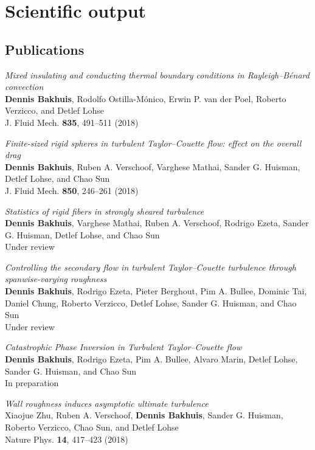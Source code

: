 \chapter{Scientific output}
\section*{Publications}
\begin{packeditemize}
\item \textit{Mixed insulating and conducting thermal boundary conditions in Rayleigh–Bénard convection} \\
\textbf{Dennis Bakhuis}, Rodolfo Ostilla-M\'onico, Erwin P. van der Poel,
Roberto Verzicco, and Detlef Lohse \\
J. Fluid Mech. \textbf{835}, 491--511 (2018)

\item \textit{Finite-sized rigid spheres in turbulent Taylor–Couette flow: effect on the overall drag} \\ 
\textbf{Dennis Bakhuis}, Ruben A. Verschoof, Varghese Mathai, Sander G.
Huisman, Detlef Lohse, and Chao Sun \\
J. Fluid Mech. \textbf{850},  246--261 (2018)

\item \textit{Statistics of rigid fibers in strongly sheared turbulence} \\ 
\textbf{Dennis Bakhuis}, Varghese Mathai, Ruben A. Verschoof, Rodrigo Ezeta, Sander G. Huisman, Detlef Lohse, and Chao Sun \\
Under review

\item \textit{Controlling the secondary flow in turbulent Taylor–Couette turbulence through spanwise-varying roughness} \\ 
\textbf{Dennis Bakhuis}, Rodrigo Ezeta, Pieter Berghout, Pim A. Bullee,
Dominic Tai, Daniel Chung, Roberto Verzicco, Detlef Lohse, Sander G. Huisman, and Chao Sun \\
Under review

\item \textit{Catastrophic Phase Inversion in Turbulent Taylor--Couette flow} \\ 
\textbf{Dennis Bakhuis}, Rodrigo Ezeta, Pim A. Bullee, Alvaro Marin, Detlef Lohse,
Sander G. Huisman, and Chao Sun \\
In preparation

\newpage

\item \textit{Wall roughness induces asymptotic ultimate turbulence} \\ 
Xiaojue Zhu, Ruben A. Verschoof, \textbf{Dennis Bakhuis}, Sander G.
Huisman, Roberto Verzicco, Chao Sun, and Detlef Lohse \\
Nature Phys. \textbf{14}, 417--423 (2018)


\end{packeditemize}
